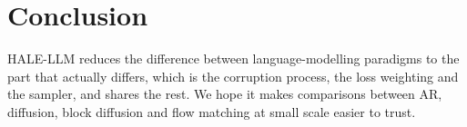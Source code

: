\documentclass[11pt]{article}
\begin{document}
\section{Conclusion}

HALE-LLM reduces the difference between language-modelling paradigms to the part that
actually differs, which is the corruption process, the loss weighting and the sampler, and
shares the rest. We hope it makes comparisons between AR, diffusion, block diffusion and
flow matching at small scale easier to trust.



\end{document}
